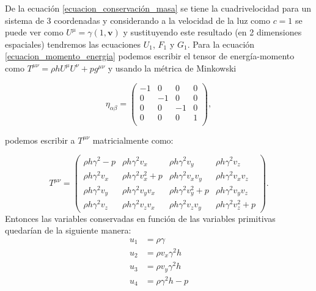 \documentclass[12pt,a4paper]{book}
\begin{document}
\noindent De la ecuación \ref{ecuacion_conservación_masa} se tiene la cuadrivelocidad para un sistema de 
3 coordenadas y considerando a la velocidad de la luz como $c=1$ se puede ver como $U^{\mu}=\gamma \left( 1, \textbf{v}\right)$ y sustituyendo este resultado (en 2 dimensiones espaciales) tendremos las ecuaciones 
$U_1$, $F_1$ y $G_1$. Para la ecuación \ref{ecuacion_momento_energia} podemos escribir el tensor de energía-momento como $T^{\mu \nu} = \rho h U^{\mu} U^{\nu} + pg^{\mu \nu}$ y usando la métrica de Minkowski

\begin{equation}
\eta_{\alpha \beta}= 
\begin{pmatrix}
 -1 & 0 & 0 & 0 \\
 0 & -1 & 0 & 0 \\
 0 & 0 & -1 & 0 \\
 0 & 0 & 0 & 1 \\ 
\end{pmatrix},
\end{equation}

\noindent podemos escribir a $T^{\mu \nu}$ matricialmente como:

\begin{equation}
T^{\mu \nu} =
\begin{pmatrix}
\rho h \gamma^2-p & \rho h \gamma^2 v_{x}  & \rho h \gamma^2 v_{y} & \rho h \gamma^2 v_{z} \\

\rho h \gamma^2 v_{x} & \rho h \gamma^2 v_{x}^{2}+p & \rho h \gamma^2 v_{x}v_{y} &  \rho h \gamma^2 v_{x}v_{z} \\

\rho h \gamma^2 v_{y} & \rho h \gamma^2 v_{y}v_{x} & \rho h \gamma^2 v_{y}^{2}+p & \rho h \gamma^2 v_{y}v_{z}\\

\rho h \gamma^2 v_{z} & \rho h \gamma^2 v_{z}v_{x} & \rho h \gamma^2 v_{z}v_{y} & \rho h \gamma^2 v_{z}^2 + p

\end{pmatrix} .
\end{equation}
Entonces las variables conservadas en función de las variables primitivas quedarían de la siguiente manera:
\begin{align}
u_{1}& = \rho \gamma \\ 
u_{2}& = \rho v_{x} \gamma^{2} h \\ 
u_{3}& = \rho v_{y} \gamma^{2} h \\ 
u_{4}& = \rho \gamma^{2} h - p 
\end{align}
\end{document}
